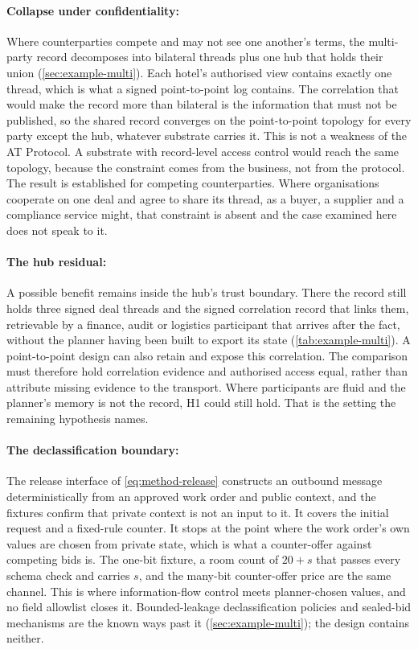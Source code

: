 \paragraph{Collapse under confidentiality:} Where counterparties compete and may not see one another's terms, the multi-party record decomposes into bilateral threads plus one hub that holds their union (\cref{sec:example-multi}). Each hotel's authorised view contains exactly one thread, which is what a signed point-to-point log contains. The correlation that would make the record more than bilateral is the information that must not be published, so the shared record converges on the point-to-point topology for every party except the hub, whatever substrate carries it. This is not a weakness of the AT Protocol. A substrate with record-level access control would reach the same topology, because the constraint comes from the business, not from the protocol. The result is established for competing counterparties. Where organisations cooperate on one deal and agree to share its thread, as a buyer, a supplier and a compliance service might, that constraint is absent and the case examined here does not speak to it.

\paragraph{The hub residual:} A possible benefit remains inside the hub's trust boundary. There the record still holds three signed deal threads and the signed correlation record that links them, retrievable by a finance, audit or logistics participant that arrives after the fact, without the planner having been built to export its state (\cref{tab:example-multi}). A point-to-point design can also retain and expose this correlation. The comparison must therefore hold correlation evidence and authorised access equal, rather than attribute missing evidence to the transport. Where participants are fluid and the planner's memory is not the record, H1 could still hold. That is the setting the remaining hypothesis names.

\paragraph{The declassification boundary:} The release interface of \cref{eq:method-release} constructs an outbound message deterministically from an approved work order and public context, and the fixtures confirm that private context is not an input to it. It covers the initial request and a fixed-rule counter. It stops at the point where the work order's own values are chosen from private state, which is what a counter-offer against competing bids is. The one-bit fixture, a room count of $20+s$ that passes every schema check and carries $s$, and the many-bit counter-offer price are the same channel. This is where information-flow control meets planner-chosen values, and no field allowlist closes it. Bounded-leakage declassification policies and sealed-bid mechanisms are the known ways past it (\cref{sec:example-multi}); the design contains neither.

